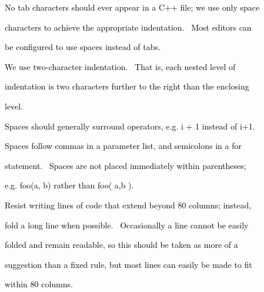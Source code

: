 \documentclass[a4paper]{article}
\newcommand\textstyleOOoComputerKeyWord[1]{\textrm{\textcolor[rgb]{0.0,0.0,0.5019608}{#1}}}
\begin{document}
{\color{black}
\textstyleOOoComputerKeyWord{\textcolor{black}{No tab characters should ever appear in a C++ file; we use only space}}}

{\color{black}
\textstyleOOoComputerKeyWord{\textcolor{black}{characters to achieve the appropriate indentation. \ Most editors can}}}

{\color{black}
\textstyleOOoComputerKeyWord{\textcolor{black}{be configured to use spaces instead of tabs.}}}


\bigskip

{\color{black}
\textstyleOOoComputerKeyWord{\textcolor{black}{We use two-character indentation. \ That is, each nested level of}}}

{\color{black}
\textstyleOOoComputerKeyWord{\textcolor{black}{indentation is two characters further to the right than the enclosing}}}

{\color{black}
\textstyleOOoComputerKeyWord{\textcolor{black}{level.}}}


\bigskip

{\color{black}
\textstyleOOoComputerKeyWord{\textcolor{black}{Spaces should generally surround operators, e.g. i + 1 instead of i+1.}}}

{\color{black}
\textstyleOOoComputerKeyWord{\textcolor{black}{Spaces follow commas in a parameter list, and semicolons in a for}}}

{\color{black}
\textstyleOOoComputerKeyWord{\textcolor{black}{statement. \ Spaces are not placed immediately within parentheses;}}}

{\color{black}
\textstyleOOoComputerKeyWord{\textcolor{black}{e.g. foo(a, b) rather than foo( a,b ).}}}


\bigskip

{\color{black}
\textstyleOOoComputerKeyWord{\textcolor{black}{Resist writing lines of code that extend beyond 80 columns; instead,}}}

{\color{black}
\textstyleOOoComputerKeyWord{\textcolor{black}{fold a long line when possible. \ Occasionally a line cannot be easily}}}

{\color{black}
\textstyleOOoComputerKeyWord{\textcolor{black}{folded and remain readable, so this should be taken as more of a}}}

{\color{black}
\textstyleOOoComputerKeyWord{\textcolor{black}{suggestion than a fixed rule, but most lines can easily be made to fit}}}

{\color{black}
\textstyleOOoComputerKeyWord{\textcolor{black}{within 80 columns.}}}
\end{document}
